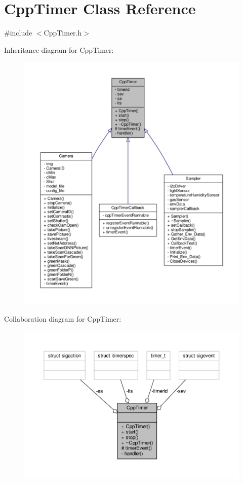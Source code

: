 \hypertarget{classCppTimer}{}\section{Cpp\+Timer Class Reference}
\label{classCppTimer}


{\ttfamily \#include $<$Cpp\+Timer.\+h$>$}



Inheritance diagram for Cpp\+Timer\+:
\nopagebreak
\begin{figure}[H]
\begin{center}
\leavevmode
\includegraphics[width=350pt]{classCppTimer__inherit__graph}
\end{center}
\end{figure}


Collaboration diagram for Cpp\+Timer\+:\nopagebreak
\begin{figure}[H]
\begin{center}
\leavevmode
\includegraphics[width=350pt]{classCppTimer__coll__graph}
\end{center}
\end{figure}

